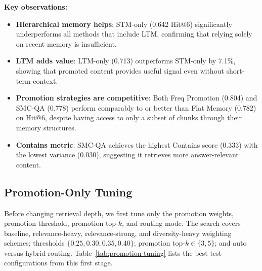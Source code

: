 \documentclass{article}
\begin{document}
\textbf{Key observations:}
\begin{itemize}
    \item \textbf{Hierarchical memory helps}: STM-only (0.642 Hit@6) significantly underperforms all methods that include LTM, confirming that relying solely on recent memory is insufficient.
    \item \textbf{LTM adds value}: LTM-only (0.713) outperforms STM-only by 7.1\%, showing that promoted content provides useful signal even without short-term context.
    \item \textbf{Promotion strategies are competitive}: Both Freq Promotion (0.804) and SMC-QA (0.778) perform comparably to or better than Flat Memory (0.782) on Hit@6, despite having access to only a subset of chunks through their memory structures.
    \item \textbf{Contains metric}: SMC-QA achieves the highest Contains score (0.333) with the lowest variance (0.030), suggesting it retrieves more answer-relevant content.
\end{itemize}

\subsection{Promotion-Only Tuning}

Before changing retrieval depth, we first tune only the promotion weights, promotion threshold, promotion top-$k$, and routing mode. The search covers baseline, relevance-heavy, relevance-strong, and diversity-heavy weighting schemes; thresholds $\{0.25,0.30,0.35,0.40\}$; promotion top-$k \in \{3,5\}$; and auto versus hybrid routing. Table~\ref{tab:promotion-tuning} lists the best test configurations from this first stage.

\begin{table}[h]
\centering
\caption{Best promotion-only tuning results on the oracle test split.}
\label{tab:promotion-tuning}
\end{table}
\end{document}
